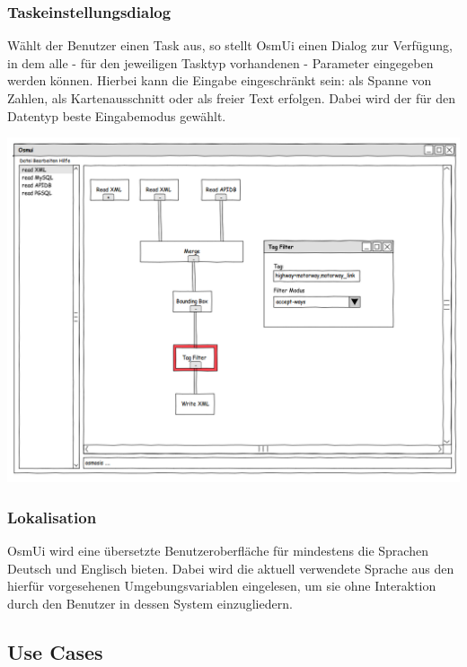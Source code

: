 \documentclass[a4paper,10pt]{scrartcl}
\begin{document}
\subsubsection{Taskeinstellungsdialog}
Wählt der Benutzer einen Task aus, so stellt OsmUi einen Dialog zur Verfügung, in dem alle - für den jeweiligen Tasktyp vorhandenen - Parameter eingegeben werden können.
Hierbei kann die Eingabe eingeschränkt sein: als Spanne von Zahlen, als Kartenausschnitt oder als freier Text erfolgen. Dabei wird der für
den Datentyp beste Eingabemodus gewählt.\\
\begin{center}
\includegraphics[width=15cm]{ui_prototype/OsmUi_Parameter_Optionen.png}
\end{center}
\subsubsection{Lokalisation}
OsmUi wird eine übersetzte Benutzeroberfläche für mindestens die Sprachen Deutsch und Englisch bieten. Dabei wird die aktuell verwendete
Sprache aus den hierfür vorgesehenen Umgebungsvariablen eingelesen, um sie ohne Interaktion durch den Benutzer in dessen System einzugliedern.

\subsection{Use Cases}
\end{document}
